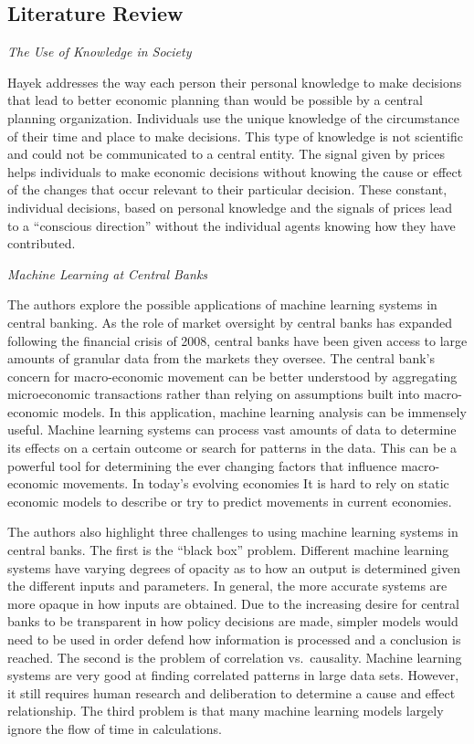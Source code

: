 \documentclass[11pt,]{article}
\begin{document}
\subsection{Literature Review}\label{literature-review}

\emph{The Use of Knowledge in Society}

Hayek addresses the way each person their personal knowledge to make
decisions that lead to better economic planning than would be possible
by a central planning organization. Individuals use the unique knowledge
of the circumstance of their time and place to make decisions. This type
of knowledge is not scientific and could not be communicated to a
central entity. The signal given by prices helps individuals to make
economic decisions without knowing the cause or effect of the changes
that occur relevant to their particular decision. These constant,
individual decisions, based on personal knowledge and the signals of
prices lead to a ``conscious direction'' without the individual agents
knowing how they have contributed.

\emph{Machine Learning at Central Banks}

The authors explore the possible applications of machine learning
systems in central banking. As the role of market oversight by central
banks has expanded following the financial crisis of 2008, central banks
have been given access to large amounts of granular data from the
markets they oversee. The central bank's concern for macro-economic
movement can be better understood by aggregating microeconomic
transactions rather than relying on assumptions built into
macro-economic models. In this application, machine learning analysis
can be immensely useful. Machine learning systems can process vast
amounts of data to determine its effects on a certain outcome or search
for patterns in the data. This can be a powerful tool for determining
the ever changing factors that influence macro-economic movements. In
today's evolving economies It is hard to rely on static economic models
to describe or try to predict movements in current economies.

The authors also highlight three challenges to using machine learning
systems in central banks. The first is the ``black box'' problem.
Different machine learning systems have varying degrees of opacity as to
how an output is determined given the different inputs and parameters.
In general, the more accurate systems are more opaque in how inputs are
obtained. Due to the increasing desire for central banks to be
transparent in how policy decisions are made, simpler models would need
to be used in order defend how information is processed and a conclusion
is reached. The second is the problem of correlation vs.~causality.
Machine learning systems are very good at finding correlated patterns in
large data sets. However, it still requires human research and
deliberation to determine a cause and effect relationship. The third
problem is that many machine learning models largely ignore the flow of
time in calculations.
\end{document}
